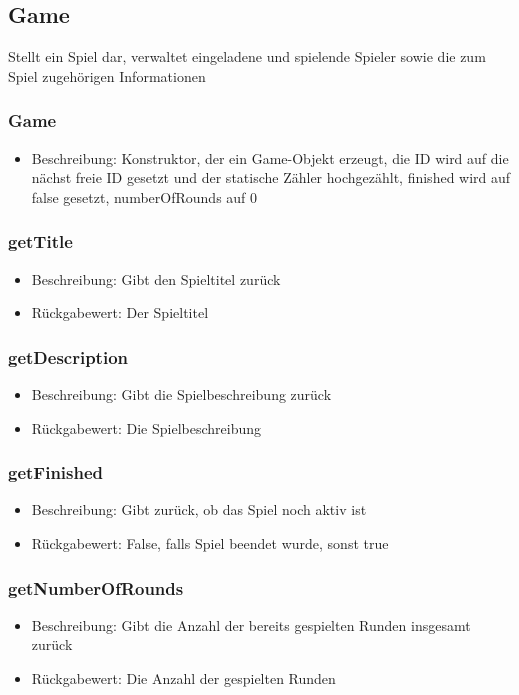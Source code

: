 \documentclass[a4paper]{scrreprt}
\begin{document}
	\subsection{Game}
	Stellt ein Spiel dar, verwaltet eingeladene und spielende Spieler sowie die zum Spiel zugehörigen Informationen
	\subsubsection{Game}
	\begin{itemize}
	\item Beschreibung: Konstruktor, der ein Game-Objekt erzeugt, die ID wird auf die nächst freie ID gesetzt und der statische Zähler hochgezählt, finished wird auf false gesetzt, numberOfRounds auf 0
	\end{itemize}

	\subsubsection{getTitle}
	\begin{itemize}
		\item Beschreibung: Gibt den Spieltitel zurück
		\item Rückgabewert: Der Spieltitel
	\end{itemize}
	\subsubsection{getDescription}
	\begin{itemize}
		\item Beschreibung: Gibt die Spielbeschreibung zurück
		\item Rückgabewert: Die Spielbeschreibung
	\end{itemize}
	\subsubsection{getFinished}
			\begin{itemize}
				\item Beschreibung: Gibt zurück, ob das Spiel noch aktiv ist
				\item Rückgabewert: False, falls Spiel beendet wurde, sonst true
			\end{itemize}
	\subsubsection{getNumberOfRounds}
		\begin{itemize}
			\item Beschreibung: Gibt die Anzahl der bereits gespielten Runden insgesamt zurück
			\item Rückgabewert: Die Anzahl der gespielten Runden
		\end{itemize}
\end{document}
